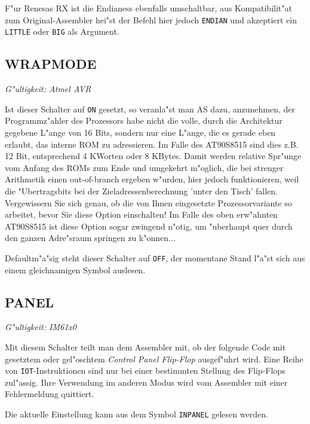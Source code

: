 \documentclass[12pt,a4paper,twoside]{report}
\makeatletter
\newcommand{\tty}[1]{{\tt #1}}
\newcommand{\ttindex}[1]{\index{#1@{\tt #1}}}
\makeatother
\begin{document}
F"ur Renesas RX ist die Endianess ebenfalls umschaltbar, aus Kompatibilit"at
zum Original-Assembler hei"st der Befehl hier jedoch \tty{ENDIAN} und
akzeptiert ein \tty{LITTLE} oder \tty{BIG} als Argument.


\subsection{WRAPMODE}
\ttindex{WRAPMODE}

{\em G"ultigkeit: Atmel AVR}

Ist dieser Schalter auf {\tt ON} gesetzt, so veranla"st man AS dazu,
anzunehmen, der Programmz"ahler des Prozessors habe nicht die volle, durch
die Architektur gegebene L"ange von 16 Bits, sondern nur eine L"ange, die
es gerade eben erlaubt, das interne ROM zu adressieren.  Im Falle des
AT90S8515 sind dies z.B. 12 Bit, entsprechend 4 KWorten oder 8 KBytes.
Damit werden relative Spr"unge vom Anfang des ROMs zum Ende und umgekehrt
m"oglich, die bei strenger Arithmetik einen out-of-branch ergeben w"urden,
hier jedoch funktionieren, weil die "Ubertragsbits bei der
Zieladressenberechnung 'unter den Tisch' fallen.  Vergewissern Sie sich
genau, ob die von Ihnen eingesetzte Prozessorvariante so arbeitet, bevor
Sie diese Option einschalten!  Im Falle des oben erw"ahnten AT90S8515 ist
diese Option sogar zwingend n"otig, um "uberhaupt quer durch den ganzen
Adre"sraum springen zu k"onnen...

Defaultm"a"sig steht dieser Schalter auf {\tt OFF}, der momentane Stand
l"a"st sich aus einem gleichnamigen Symbol auslesen.


\subsection{PANEL}
\ttindex{PANEL}

{\em G"ultigkeit: IM61x0}

Mit diesem Schalter teilt man dem Assembler mit, ob der folgende Code
mit gesetztem oder gel"oschtem {\em Control Panel Flip-Flop} ausgef"uhrt
wird.  Eine Reihe von {\tt IOT}-Instruktionen sind nur bei einer bestimmten
Stellung des Flip-Flops zul"assig.  Ihre Verwendung im anderen Modus
wird vom Assembler mit einer Fehlermeldung quittiert.

Die aktuelle Einstellung kann aus dem Symbol {\tt INPANEL} gelesen werden.
\end{document}
